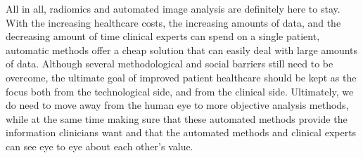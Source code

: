 All in all, radiomics and automated image analysis are definitely here to stay.
With the increasing healthcare costs, the increasing amounts of data, and the decreasing amount of time clinical experts can spend on a single patient, automatic methods offer a cheap solution that can easily deal with large amounts of data.
Although several methodological and social barriers still need to be overcome, the ultimate goal of improved patient healthcare should be kept as the focus both from the technological side, and from the clinical side.
Ultimately, we do need to move away from the human eye to more objective analysis methods, while at the same time making sure that these automated methods provide the information clinicians want and that the automated methods and clinical experts can see eye to eye about each other's value.
